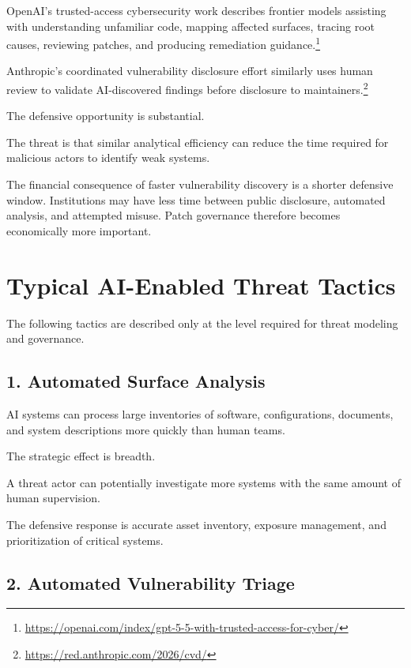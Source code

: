 OpenAI's trusted-access cybersecurity work describes frontier models assisting with understanding unfamiliar code, mapping affected surfaces, tracing root causes, reviewing patches, and producing remediation guidance.\footnote{\url{https://openai.com/index/gpt-5-5-with-trusted-access-for-cyber/}}

Anthropic's coordinated vulnerability disclosure effort similarly uses human review to validate AI-discovered findings before disclosure to maintainers.\footnote{\url{https://red.anthropic.com/2026/cvd/}}

The defensive opportunity is substantial.

The threat is that similar analytical efficiency can reduce the time required for malicious actors to identify weak systems.

\begin{risklens}
The financial consequence of faster vulnerability discovery is a shorter defensive window. Institutions may have less time between public disclosure, automated analysis, and attempted misuse. Patch governance therefore becomes economically more important.
\end{risklens}

\section{Typical AI-Enabled Threat Tactics}

The following tactics are described only at the level required for threat modeling and governance.

\subsection{1. Automated Surface Analysis}

AI systems can process large inventories of software, configurations, documents, and system descriptions more quickly than human teams.

The strategic effect is breadth.

A threat actor can potentially investigate more systems with the same amount of human supervision.

The defensive response is accurate asset inventory, exposure management, and prioritization of critical systems.

\subsection{2. Automated Vulnerability Triage}

